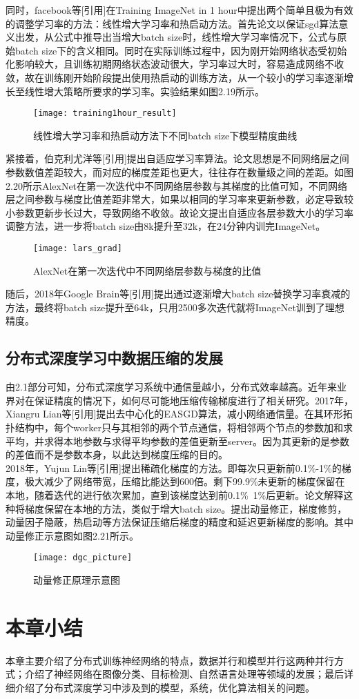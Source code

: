 同时，facebook等[引用]在Training ImageNet in 1 hour中提出两个简单且极为有效的调整学习率的方法：线性增大学习率和热启动方法。首先论文以保证sgd算法意义出发，从公式中推导出当增大batch size时，线性增大学习率情况下，公式与原始batch size下的含义相同。同时在实际训练过程中，因为刚开始网络状态受初始化影响较大，且训练初期网络状态波动很大，学习率过大时，容易造成网络不收敛，故在训练刚开始阶段提出使用热启动的训练方法，从一个较小的学习率逐渐增长至线性增大策略所要求的学习率。实验结果如图2.19所示。\\
\begin{figure}[htp]
\centering
\texttt{[image: training1hour\_result]}
\caption{线性增大学习率和热启动方法下不同batch size下模型精度曲线}
\end{figure}
紧接着，伯克利尤洋等[引用]提出自适应学习率算法。论文思想是不同网络层之间参数数值差距较大，而对应的梯度差距也更大，往往存在数量级之间的差距。如图2.20所示AlexNet在第一次迭代中不同网络层参数与其梯度的比值可知，不同网络层之间参数与梯度比值差距非常大，如果以相同的学习率来更新参数，必定导致较小参数更新步长过大，导致网络不收敛。故论文提出自适应各层参数大小的学习率调整方法，进一步将batch size由8k提升至32k，在24分钟内训完ImageNet。\\
\begin{figure}[htp]
\centering
\texttt{[image: lars\_grad]}
\caption{AlexNet在第一次迭代中不同网络层参数与梯度的比值}
\end{figure}
随后，2018年Google Brain等[引用]提出通过逐渐增大batch size替换学习率衰减的方法，最终将batch size提升至64k，只用2500多次迭代就将ImageNet训到了理想精度。\\
\subsection{分布式深度学习中数据压缩的发展}
由2.1部分可知，分布式深度学习系统中通信量越小，分布式效率越高。近年来业界对在保证精度的情况下，如何尽可能地压缩传输梯度进行了相关研究。2017年，Xiangru Lian等[引用]提出去中心化的EASGD算法，减小网络通信量。在其环形拓扑结构中，每个worker只与其相邻的两个节点通信，将相邻两个节点的参数加和求平均，并求得本地参数与求得平均参数的差值更新至server。因为其更新的是参数的差值而不是参数本身，以此达到梯度压缩的目的。\\
2018年，Yujun Lin等[引用]提出稀疏化梯度的方法。即每次只更新前0.1\%-1\%的梯度，极大减少了网络带宽，压缩比能达到600倍。剩下99.9\%未更新的梯度保留在本地，随着迭代的进行依次累加，直到该梯度达到前0.1\%~1\%后更新。论文解释这种将梯度保留在本地的方法，类似于增大batch size。提出动量修正，梯度修剪，动量因子隐蔽，热启动等方法保证压缩后梯度的精度和延迟更新梯度的影响。其中动量修正示意图如图2.21所示。
\begin{figure}[htp]
\centering
\texttt{[image: dgc\_picture]}
\caption{动量修正原理示意图}
\end{figure}

\section{本章小结}
本章主要介绍了分布式训练神经网络的特点，数据并行和模型并行这两种并行方式；介绍了神经网络在图像分类、目标检测、自然语言处理等领域的发展；最后详细介绍了分布式深度学习中涉及到的模型，系统，优化算法相关的问题。




